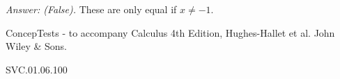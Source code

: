 {\it Answer: (False).}   These are only equal if $x \neq -1$.

\medskip
ConcepTests - to accompany Calculus 4th Edition, Hughes-Hallet et al. John Wiley \& Sons.

SVC.01.06.100


